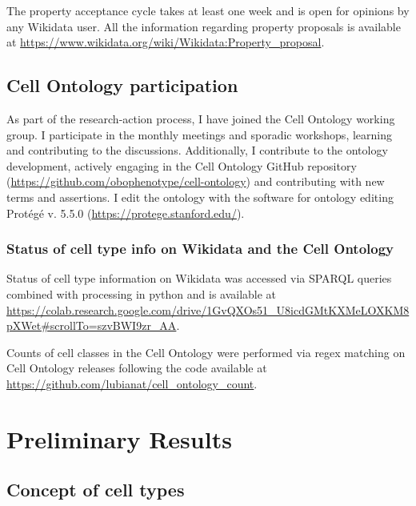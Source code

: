 The property acceptance cycle takes at least one week and is open for opinions by any Wikidata user.
All the information regarding property proposals is available at \url{https://www.wikidata.org/wiki/Wikidata:Property_proposal}.

\hypertarget{cell-ontology-participation}{%
\subsection{Cell Ontology participation}\label{cell-ontology-participation}}

As part of the research-action process, I have joined the Cell Ontology working group.
I participate in the monthly meetings and sporadic workshops, learning and contributing to the discussions.
Additionally, I contribute to the ontology development, actively engaging in the Cell Ontology GitHub repository (\url{https://github.com/obophenotype/cell-ontology}) and contributing with new terms and assertions.
I edit the ontology with the software for ontology editing Protégé v. 5.5.0 (\url{https://protege.stanford.edu/}).

\hypertarget{status-of-cell-type-info-on-wikidata-and-the-cell-ontology}{%
\subsubsection{Status of cell type info on Wikidata and the Cell Ontology}\label{status-of-cell-type-info-on-wikidata-and-the-cell-ontology}}

Status of cell type information on Wikidata was accessed via SPARQL queries combined with processing in python and is available at \url{https://colab.research.google.com/drive/1GvQXOs51_U8icdGMtKXMeLOXKM8pXWet\#scrollTo=szvBWI9zr_AA}.

Counts of cell classes in the Cell Ontology were performed via regex matching on Cell Ontology releases following the code available at \url{https://github.com/lubianat/cell_ontology_count}.

\hypertarget{preliminary-results}{%
\section{Preliminary Results}\label{preliminary-results}}

\hypertarget{concept-of-cell-types}{%
\subsection{Concept of cell types}\label{concept-of-cell-types}}

